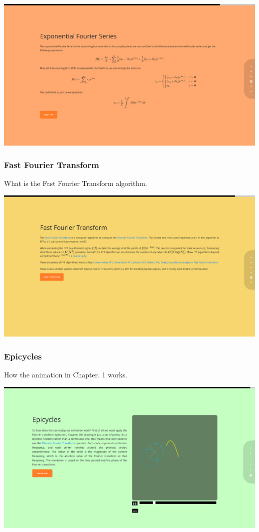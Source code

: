 \documentclass{article}
\begin{document}
\includegraphics[width=\textwidth]{chap15.png}

\subsubsection{Fast Fourier Transform}

What is the Fast Fourier Transform algorithm.

\includegraphics[width=\textwidth]{chap16.png}

\subsubsection{Epicycles}

How the animation in Chapter. 1 works.

\includegraphics[width=\textwidth]{chap17.png}
\end{document}
